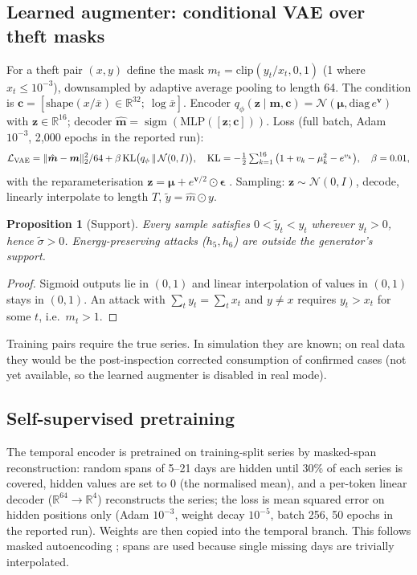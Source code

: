 \documentclass[11pt,a4paper]{article}
\theoremstyle{plain}
\newtheorem{proposition}{Proposition}
\theoremstyle{definition}
\theoremstyle{remark}
\newcommand{\R}{\mathbb{R}}
\newcommand{\sig}{\operatorname{sigm}}
\begin{document}
\subsection{Learned augmenter: conditional VAE over theft masks}
For a theft pair $(x,y)$ define the mask $m_t=\mathrm{clip}(y_t/x_t,0,1)$ (1 where $x_t\le10^{-3}$), downsampled by adaptive average pooling to length 64. The condition is $\bm c=[\text{shape}(x/\bar x)\in\R^{32};\ \log\bar x]$. Encoder $q_\phi(\bm z\mid\bm m,\bm c)=\mathcal N(\bm\mu,\mathrm{diag}\,e^{\bm v})$ with $\bm z\in\R^{16}$; decoder $\hat{\bm m}=\sig(\mathrm{MLP}([\bm z;\bm c]))$. Loss (full batch, Adam $10^{-3}$, 2{,}000 epochs in the reported run):
\begin{equation}
\mathcal L_{\rm VAE}=\|\hat{\bm m}-\bm m\|_2^2/64+\beta\,\mathrm{KL}\big(q_\phi\,\|\,\mathcal N(0,I)\big),\quad
\mathrm{KL}=-\tfrac12\textstyle\sum_{k=1}^{16}\big(1+v_k-\mu_k^2-e^{v_k}\big),\quad\beta=0.01,
\end{equation}
with the reparameterisation $\bm z=\bm\mu+e^{\bm v/2}\odot\bm\epsilon$ \citep{kingma2014,sohn2015}. Sampling: $\bm z\sim\mathcal N(0,I)$, decode, linearly interpolate to length $T$, $\tilde y=\hat m\odot y$.
\begin{proposition}[Support]
\label{prop:cvae}
Every sample satisfies $0<\tilde y_t<y_t$ wherever $y_t>0$, hence $\tilde\sigma>0$. Energy-preserving attacks ($h_5,h_6$) are outside the generator's support.
\end{proposition}
\begin{proof}
Sigmoid outputs lie in $(0,1)$ and linear interpolation of values in $(0,1)$ stays in $(0,1)$. An attack with $\sum_t y_t=\sum_tx_t$ and $y\ne x$ requires $y_t>x_t$ for some $t$, i.e.\ $m_t>1$.
\end{proof}
Training pairs require the true series. In simulation they are known; on real data they would be the post-inspection corrected consumption of confirmed cases (not yet available, so the learned augmenter is disabled in real mode).

\subsection{Self-supervised pretraining}
The temporal encoder is pretrained on training-split series by masked-span reconstruction: random spans of 5--21 days are hidden until 30\% of each series is covered, hidden values are set to 0 (the normalised mean), and a per-token linear decoder ($\R^{64}\to\R^4$) reconstructs the series; the loss is mean squared error on hidden positions only (Adam $10^{-3}$, weight decay $10^{-5}$, batch 256, 50 epochs in the reported run). Weights are then copied into the temporal branch. This follows masked autoencoding \citep{he2022mae}; spans are used because single missing days are trivially interpolated.
\end{document}
